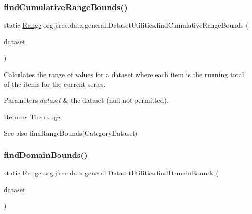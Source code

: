 \subsubsection{\texorpdfstring{find\+Cumulative\+Range\+Bounds()}{findCumulativeRangeBounds()}}
{\footnotesize\ttfamily static \mbox{\hyperlink{classorg_1_1jfree_1_1data_1_1_range}{Range}} org.\+jfree.\+data.\+general.\+Dataset\+Utilities.\+find\+Cumulative\+Range\+Bounds (\begin{DoxyParamCaption}\item[{\mbox{\hyperlink{interfaceorg_1_1jfree_1_1data_1_1category_1_1_category_dataset}{Category\+Dataset}}}]{dataset }\end{DoxyParamCaption})\hspace{0.3cm}{\ttfamily [static]}}

Calculates the range of values for a dataset where each item is the running total of the items for the current series.


\begin{DoxyParams}{Parameters}
{\em dataset} & the dataset ({\ttfamily null} not permitted).\\
\hline
\end{DoxyParams}
\begin{DoxyReturn}{Returns}
The range.
\end{DoxyReturn}
\begin{DoxySeeAlso}{See also}
\mbox{\hyperlink{classorg_1_1jfree_1_1data_1_1general_1_1_dataset_utilities_a688e428b19801191aec39518a19265ae}{find\+Range\+Bounds(\+Category\+Dataset)}} 
\end{DoxySeeAlso}
\mbox{\label{classorg_1_1jfree_1_1data_1_1general_1_1_dataset_utilities_aec9ad9fc9eeff78df3d1f9ad1b7c753e}} 
\subsubsection{\texorpdfstring{find\+Domain\+Bounds()}{findDomainBounds()}\hspace{0.1cm}{\footnotesize\ttfamily [1/3]}}
{\footnotesize\ttfamily static \mbox{\hyperlink{classorg_1_1jfree_1_1data_1_1_range}{Range}} org.\+jfree.\+data.\+general.\+Dataset\+Utilities.\+find\+Domain\+Bounds (\begin{DoxyParamCaption}\item[{\mbox{\hyperlink{interfaceorg_1_1jfree_1_1data_1_1xy_1_1_x_y_dataset}{X\+Y\+Dataset}}}]{dataset }\end{DoxyParamCaption})\hspace{0.3cm}{\ttfamily [static]}}

